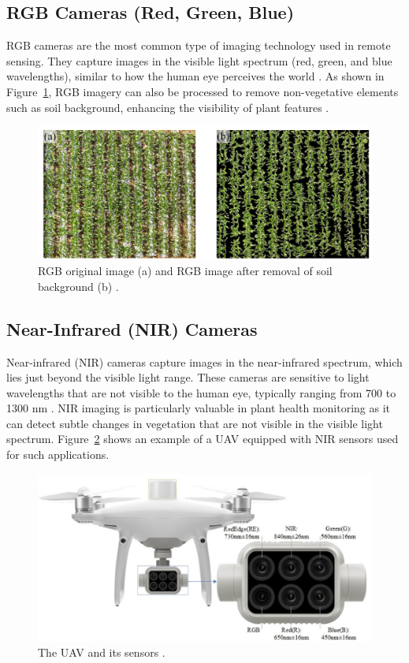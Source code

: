 \subsection{RGB Cameras (Red, Green, Blue)}
RGB cameras are the most common type of imaging technology used in remote sensing. They capture images in the visible light spectrum (red, green, and blue wavelengths), similar to how the human eye perceives the world \parencite{delavarpour2021technical}. As shown in Figure~\ref{fig:RGBbackground}, RGB imagery can also be processed to remove non-vegetative elements such as soil background, enhancing the visibility of plant features \parencite{li2024monitoring}.

\begin{figure}[H]
    \centering
    \includegraphics[width=0.8
    \textwidth]{chapters/chapter3/images/Figure02.png}
    \caption{RGB original image (a) and RGB image after removal of soil background (b) \protect\parencite{li2024monitoring}.}
    \label{fig:RGBbackground}
\end{figure}

\subsection{Near-Infrared (NIR) Cameras}

Near-infrared (NIR) cameras capture images in the near-infrared spectrum, which lies just beyond the visible light range. These cameras are sensitive to light wavelengths that are not visible to the human eye, typically ranging from 700 to 1300 nm \parencite{delavarpour2021technical}. NIR imaging is particularly valuable in plant health monitoring as it can detect subtle changes in vegetation that are not visible in the visible light spectrum. Figure~\ref{fig:UAVsensors} shows an example of a UAV equipped with NIR sensors used for such applications.


\begin{figure}[H]
    \centering
    \includegraphics[width=0.8
    \textwidth]{chapters/chapter3/images/Figure03.png}
    \caption{The UAV and its sensors \protect\parencite{li2024monitoring}.}
    \label{fig:UAVsensors}
\end{figure}


